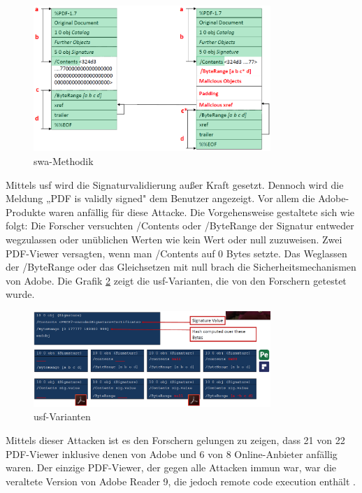 \begin{figure}[!htb]
	\centering
	\includegraphics[width=0.8\textwidth]{"images/sig_wrap_attack.png"}
	\caption{\gls{swa}-Methodik \cite{ccc-break-pdf-slides}}
	\label{fig:swa}
\end{figure}

Mittels \gls{usf} wird die Signaturvalidierung außer Kraft gesetzt. Dennoch wird die Meldung „PDF is validly signed" dem Benutzer angezeigt. Vor allem die Adobe-Produkte waren anfällig für diese Attacke. Die Vorgehensweise gestaltete sich wie folgt: Die Forscher versuchten /Contents oder /ByteRange der Signatur entweder wegzulassen oder unüblichen Werten wie kein Wert oder null zuzuweisen. Zwei PDF-Viewer versagten, wenn man /Contents auf 0 Bytes setzte. Das Weglassen der /ByteRange oder das Gleichsetzen mit null brach die Sicherheitsmechanismen von Adobe. Die Grafik \ref{fig:usf} zeigt die \gls{usf}-Varianten, die von den Forschern getestet wurde.
\par

\begin{figure}[!htb]
	\centering
	\includegraphics[width=0.8\textwidth]{"images/univ_sig_forgery.png"}
	\caption{\gls{usf}-Varianten \cite{ccc-break-pdf-slides}}
	\label{fig:usf}
\end{figure}

Mittels dieser Attacken ist es den Forschern gelungen zu zeigen, dass 21 von 22 PDF-Viewer inklusive denen von Adobe und 6 von 8 Online-Anbieter anfällig waren. Der einzige PDF-Viewer, der gegen alle Attacken immun war, war die veraltete Version von Adobe Reader 9, die jedoch remote code execution enthält \cite{ccc-break-pdf}. 